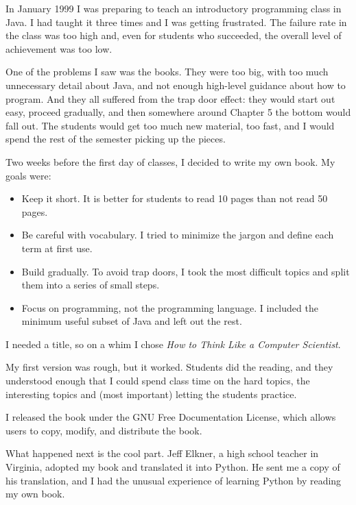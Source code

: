 \documentclass[11pt]{book}
\begin{document}
In January 1999 I was preparing to teach an introductory programming
class in Java.  I had taught it three times and I was getting
frustrated.  The failure rate in the class was too high and, even for
students who succeeded, the overall level of achievement was too low.

One of the problems I saw was the books.  
They were too big, with too much unnecessary detail about Java, and
not enough high-level guidance about how to program.  And they all
suffered from the trap door effect: they would start out easy,
proceed gradually, and then somewhere around Chapter 5 the bottom would
fall out.  The students would get too much new material, too fast,
and I would spend the rest of the semester picking up the pieces.

Two weeks before the first day of classes, I decided to write my
own book.  
My goals were:

\begin{itemize}

\item Keep it short.  It is better for students to read 10 pages
than not read 50 pages.

\item Be careful with vocabulary.  I tried to minimize the jargon
and define each term at first use.

\item Build gradually. To avoid trap doors, I took the most difficult
topics and split them into a series of small steps. 

\item Focus on programming, not the programming language.  I included
the minimum useful subset of Java and left out the rest.

\end{itemize}

I needed a title, so on a whim I chose \emph{How to Think Like
a Computer Scientist}.

My first version was rough, but it worked.  Students did the reading,
and they understood enough that I could spend class time on the hard
topics, the interesting topics and (most important) letting the
students practice.

I released the book under the GNU Free Documentation License,
which allows users to copy, modify, and distribute the book.


What happened next is the cool part.  Jeff Elkner, a high school
teacher in Virginia, adopted my book and translated it into
Python.  He sent me a copy of his translation, and I had the
unusual experience of learning Python by reading my own book.
\end{document}
